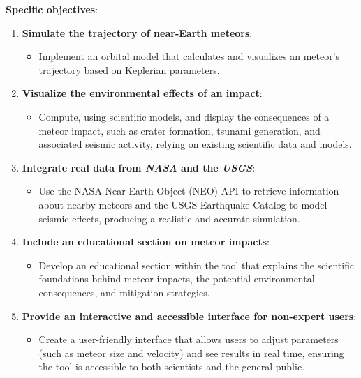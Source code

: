 \documentclass[conference]{IEEEtran}
\begin{document}
\textbf{Specific objectives}:
\begin{enumerate}
	\item \textbf{Simulate the trajectory of near-Earth meteors}:
	      \begin{itemize}
		      \item{ Implement an orbital model that calculates and visualizes an
		            meteor's trajectory based on Keplerian parameters.}
	      \end{itemize}

	\item \textbf{Visualize the environmental effects of an impact}:
	      \begin{itemize}
		      \item{ Compute, using scientific models, and display the consequences
		            of a meteor impact, such as crater formation, tsunami
		            generation, and associated seismic activity, relying on existing
		            scientific data and models.}
	      \end{itemize}

	\item \textbf{Integrate real data from \textit{NASA} and the \textit{USGS}}:
	      \begin{itemize}
		      \item{ Use the NASA Near-Earth Object (NEO) API to retrieve
		            information about nearby meteors and the USGS Earthquake
		            Catalog to model seismic effects, producing a realistic and
		            accurate simulation.}
	      \end{itemize}

	\item \textbf{Include an educational section on meteor impacts}:
	      \begin{itemize}
		      \item{ Develop an educational section within the tool that explains the
		            scientific foundations behind meteor impacts, the potential
		            environmental consequences, and mitigation strategies.}
	      \end{itemize}

	\item \textbf{Provide an interactive and accessible interface for non-expert users}:
	      \begin{itemize}
		      \item{ Create a user-friendly interface that allows users to adjust
		            parameters (such as meteor size and velocity) and see results
		            in real time, ensuring the tool is accessible to both scientists
		            and the general public.}
	      \end{itemize}


\end{enumerate}
\end{document}
